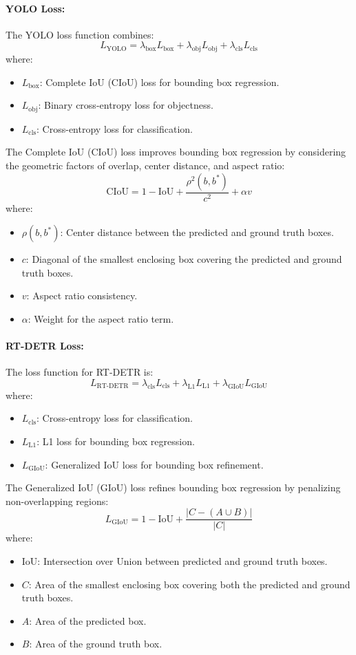\documentclass[a4paper]{article}
\begin{document}
\paragraph{YOLO Loss:}
The YOLO loss function combines:
\[
L_{\text{YOLO}} = \lambda_{\text{box}} L_{\text{box}} + \lambda_{\text{obj}} L_{\text{obj}} + \lambda_{\text{cls}} L_{\text{cls}}
\]
where:
\begin{itemize}
    \item \( L_{\text{box}} \): Complete IoU (CIoU) loss for bounding box regression.
    \item \( L_{\text{obj}} \): Binary cross-entropy loss for objectness.
    \item \( L_{\text{cls}} \): Cross-entropy loss for classification.
\end{itemize}
The Complete IoU (CIoU) loss improves bounding box regression by considering the geometric factors of overlap, center distance, and aspect ratio:
\[
\text{CIoU} = 1 - \text{IoU} + \frac{\rho^2(b, b^*)}{c^2} + \alpha v
\]
where:
\begin{itemize}
    \item \( \rho(b, b^*) \): Center distance between the predicted and ground truth boxes.
    \item \( c \): Diagonal of the smallest enclosing box covering the predicted and ground truth boxes.
    \item \( v \): Aspect ratio consistency.
    \item \( \alpha \): Weight for the aspect ratio term.
\end{itemize}

\paragraph{RT-DETR Loss:}
The loss function for RT-DETR is:
\[
L_{\text{RT-DETR}} = \lambda_{\text{cls}} L_{\text{cls}} + \lambda_{\text{L1}} L_{\text{L1}} + \lambda_{\text{GIoU}} L_{\text{GIoU}}
\]
where:
\begin{itemize}
    \item \( L_{\text{cls}} \): Cross-entropy loss for classification.
    \item \( L_{\text{L1}} \): L1 loss for bounding box regression.
    \item \( L_{\text{GIoU}} \): Generalized IoU loss for bounding box refinement.
\end{itemize}
The Generalized IoU (GIoU) loss refines bounding box regression by penalizing non-overlapping regions:
\[
L_{\text{GIoU}} = 1 - \text{IoU} + \frac{|C - (A \cup B)|}{|C|}
\]
where:
\begin{itemize}
    \item \( \text{IoU} \): Intersection over Union between predicted and ground truth boxes.
    \item \( C \): Area of the smallest enclosing box covering both the predicted and ground truth boxes.
    \item \( A \): Area of the predicted box.
    \item \( B \): Area of the ground truth box.
\end{itemize}
\end{document}
